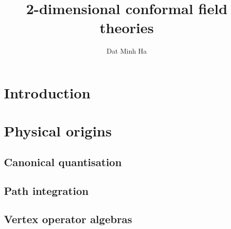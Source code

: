 

\setcounter{section}{-1}





    \title{2-dimensional conformal field theories}
    
    \author{Dat Minh Ha}
    \maketitle
    
    \begin{abstract}
        
    \end{abstract}
    
    {
      \hypersetup{} 
      \tableofcontents %
    }

    \section{Introduction}

    \section{Physical origins}
        \subsection{Canonical quantisation}

        \subsection{Path integration}

        \subsection{Vertex operator algebras}
    
    \printbibliography

